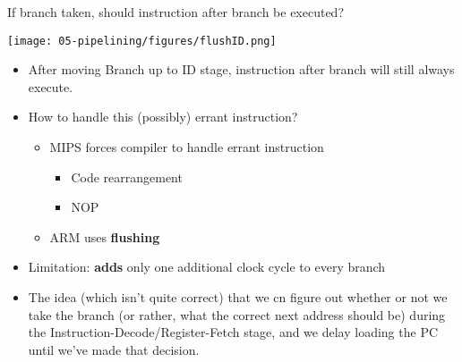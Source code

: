 \begin{frame}[fragile]
\begin{multicols}{2}
\begin{tcolorbox}[enhanced,attach boxed title to top center={yshift=-3mm,yshifttext=-1mm},
  colback=blue!5!white,colframe=blue!75!black,colbacktitle=blue!80!black,
  title=Think About It,fonttitle=\bfseries,
  boxed title style={size=small,colframe=red!50!black} ]

If branch taken, should instruction after branch be executed? \ifnum{}\fi
\end{tcolorbox}

\columnbreak    
\texttt{[image: 05-pipelining/figures/flushID.png]}
 
\end{multicols}


\begin{itemize}
\item After moving Branch up to ID stage, instruction after branch 
	will still always execute.
 \item How to handle this (possibly) errant instruction? 
\begin{itemize}
    \item MIPS forces compiler to handle errant instruction
    \begin{itemize}
        \item Code rearrangement
        \item NOP
    \end{itemize}
    \item ARM uses \textbf{flushing}

\end{itemize}

    \item Limitation: \textbf{adds} only one additional clock cycle to every branch

\end{itemize}
\BNotes\ifnum{}
\begin{itemize}
\item The idea (which isn't quite correct) that we cn figure out whether or
  not we take the branch (or rather, what the correct next address should be)
  during the Instruction-Decode/Register-Fetch stage, and we delay loading
  the PC until we've made that decision.


\end{itemize}
\end{frame}
